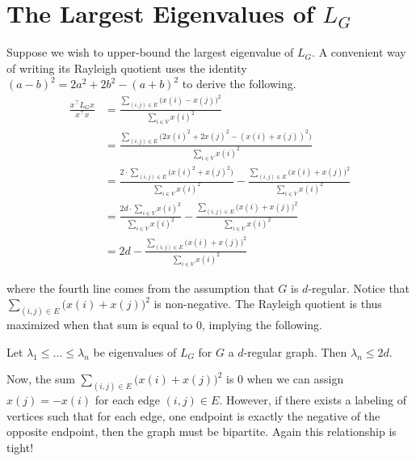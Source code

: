 \section{The Largest Eigenvalues of $L_G$}

Suppose we wish to upper-bound the largest eigenvalue of $L_G$. A convenient way of writing its Rayleigh quotient uses the identity $(a - b)^2 = 2a^2 + 2b^2 - (a + b)^2$ to derive the following.
\begin{align*}
\frac{x^\top L_G x}{x^\top x}
&= \frac{\sum_{(i, j) \in E} \big( x(i) - x(j) \big)^2 }{\sum_{i \in V} x(i)^2} \\
&= \frac{\sum_{(i, j) \in E} \big( 2 x(i)^2 + 2 x(j)^2 - (x(i) + x(j))^2 \big)}{\sum_{i \in V} x(i)^2} \\
&= \frac{2 \cdot \sum_{(i, j) \in E} \big( x(i)^2 + x(j)^2 \big)}{\sum_{i \in V} x(i)^2}
  - \frac{\sum_{(i, j) \in E} \big( x(i) + x(j) \big)^2 }{\sum_{i \in V} x(i)^2} \\
&= \frac{2d \cdot \sum_{i \in V} x(i)^2}{\sum_{i \in V} x(i)^2}
  - \frac{\sum_{(i, j) \in E} \big( x(i) + x(j) \big)^2 }{\sum_{i \in V} x(i)^2} \\
&= 2d - \frac{\sum_{(i, j) \in E} \big( x(i) + x(j) \big)^2 }{\sum_{i \in V} x(i)^2}
\end{align*}

where the fourth line comes from the assumption that $G$ is $d$-regular. Notice that $\sum_{(i, j) \in E} \big( x(i) + x(j) \big)^2$ is non-negative. The Rayleigh quotient is thus maximized when that sum is equal to 0, implying the following.

\begin{claim}
Let $\lambda_1 \leq \ldots \leq \lambda_n$ be eigenvalues of $L_G$ for $G$ a $d$-regular graph. Then $\lambda_n \leq 2d$.
\end{claim}

Now, the sum $\sum_{(i, j) \in E} \big( x(i) + x(j) \big)^2$ is 0 when we can assign $x(j) = -x(i)$  for each edge $(i, j) \in E$. However, if there exists a labeling of vertices such that for each edge, one endpoint is exactly the negative of the opposite endpoint, then the graph must be bipartite. Again this relationship is tight!

